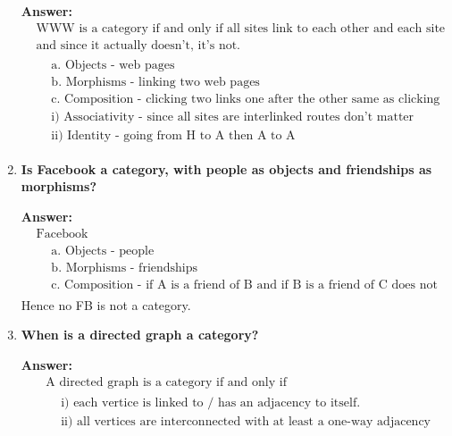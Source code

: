 \documentclass{article}
\begin{document}
\begin{enumerate}
	      \textbf{Answer:}
	      \begin{align*}
		       & \text{WWW is a category if and only if all sites link to each other and each site links to itself} \\
		       & \text{and since it actually doesn't, it's not.}                                                    \\
		       & \begin{aligned}
			          & \text{a. Objects - web pages}                                                               \\
			          & \text{b. Morphisms - linking two web pages}                                                 \\
			          & \text{c. Composition - clicking two links one after the other same as clicking direct link} \\
			          & \text{i) Associativity - since all sites are interlinked routes don't matter}               \\
			          & \text{ii) Identity - going from H to A then A to A}
		         \end{aligned}
	      \end{align*}

	\item \textbf{Is Facebook a category, with people as objects and friendships as morphisms?}

	      \textbf{Answer:}
	      \begin{align*}
		       & \text{Facebook}                                                                                                                 \\
		       & \begin{aligned}
			          & \text{a. Objects - people}                                                                                                   \\
			          & \text{b. Morphisms - friendships}                                                                                            \\
			          & \text{c. Composition - if A is a friend of B and if B is a friend of C does not necessarily entail that A \& C are friends.}
		         \end{aligned}
	      \end{align*}
	      Hence no FB is not a category.

	\item \textbf{When is a directed graph a category?}

	      \textbf{Answer:}
	      \begin{align*}
		       & \text{A directed graph is a category if and only if}                            \\
		       & \begin{aligned}
			          & \text{i) each vertice is linked to / has an adjacency to itself.}            \\
			          & \text{ii) all vertices are interconnected with at least a one-way adjacency}
		         \end{aligned}
	      \end{align*}
\end{enumerate}
\end{document}
